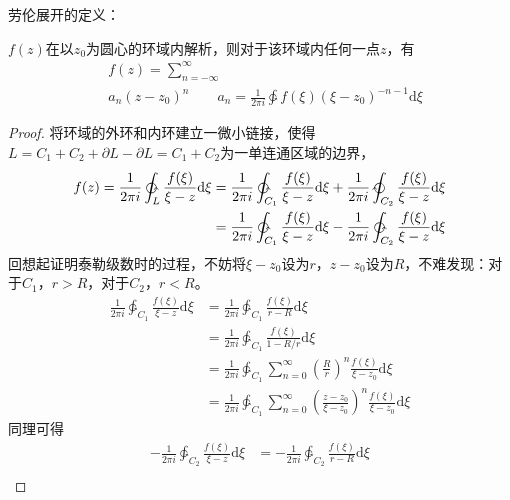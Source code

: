 \documentclass[12pt, a4paper, oneside]{ctexart}
\def\D{\mathrm{d}}
\newcommand{\F}[1][z]
{\ensuremath{f(#1)}}
\begin{document}
劳伦展开的定义：

$\F$在以$z_0$为圆心的环域内解析，则对于该环域内任何一点$z$，有
\begin{align*}
     & \F = \sum_{n=-\infty}^\infty                                                                 \\
     & a_n (z-z_0)^n\quad\quad a_n=\frac{1}{2\pi i} \ointctrclockwise \F[\xi](\xi-z_0)^{-n-1}\D \xi
\end{align*}
\begin{proof}
    将环域的外环和内环建立一微小链接，使得$L=C_1+C_2+\partial L - \partial L = C_1+C_2$为一单连通区域的边界，
    \begin{align*}
        \F = \frac{1}{2\pi i} \ointctrclockwise_L \frac{\F[\xi]}{\xi-z}\D \xi=\frac{1}{2\pi i} \ointctrclockwise_{C_1} \frac{\F[\xi]}{\xi-z}\D \xi+\frac{1}{2\pi i} \ointclockwise_{C_2} \frac{\F[\xi]}{\xi-z}\D \xi \\
        = \frac{1}{2\pi i} \ointctrclockwise_{C_1} \frac{\F[\xi]}{\xi-z}\D \xi -\frac{1}{2\pi i} \ointctrclockwise_{C_2} \frac{\F[\xi]}{\xi-z}\D \xi                                                                 \\
    \end{align*}
    回想起证明泰勒级数时的过程，不妨将$\xi-z_0$设为$r$，$z-z_0$设为$R$，不难发现：对于$C_1$，$r>R$，对于$C_2$，$r<R$。
    \begin{align*}
        \frac{1}{2\pi i} \ointctrclockwise_{C_1} \frac{\F[\xi]}{\xi-z}\D \xi
         & = \frac{1}{2\pi i} \ointctrclockwise_{C_1} \frac{\F[\xi]}{r-R}\D \xi                                                              \\
         & = \frac{1}{2\pi i} \ointctrclockwise_{C_1} \frac{\F[\xi]}{1-R/r}\D \xi                                                            \\
         & =\frac{1}{2\pi i} \ointctrclockwise_{C_1} \sum_{n=0}^\infty \left(\frac{R}{r}\right)^n  \frac{\F[\xi]}{\xi-z_0} \D \xi            \\
         & =\frac{1}{2\pi i} \ointctrclockwise_{C_1} \sum_{n=0}^\infty  \left(\frac{z-z_0}{\xi-z_0}\right)^n  \frac{\F[\xi]}{\xi-z_0} \D \xi
    \end{align*}
    同理可得
    \begin{align*}
        -\frac{1}{2\pi i} \ointctrclockwise_{C_2} \frac{\F[\xi]}{\xi-z}\D \xi
         & = -\frac{1}{2\pi i} \ointctrclockwise_{C_2} \frac{\F[\xi]}{r-R}\D \xi                                                           \\

\end{align*}
\end{proof}
\end{document}
